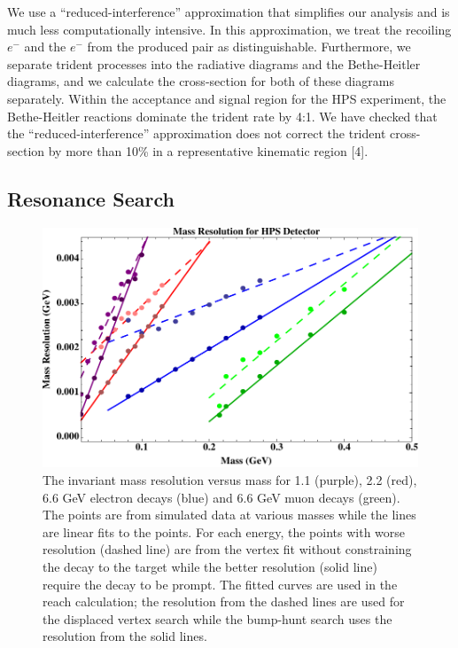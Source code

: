 We use a ``reduced-interference'' approximation that simplifies our analysis and is much 
less computationally intensive.  In this approximation, we treat the recoiling $e^-$ and 
the $e^-$ from the produced pair as distinguishable. Furthermore, we separate trident 
processes into the radiative diagrams and the Bethe-Heitler diagrams, and
 we calculate the cross-section for both of these diagrams separately.
 Within the acceptance and signal region for the HPS experiment, the Bethe-Heitler 
reactions dominate the trident rate by 4:1. We have checked that the ``reduced-interference''
 approximation does not correct the trident cross-section by more than 10\% in a 
representative kinematic region [4].



\subsection{Resonance Search}


\begin{figure}
\includegraphics[scale=1.0]{reach/mass-resolution.pdf}
\caption{The invariant mass resolution versus mass for 1.1 (purple), 2.2 (red), 6.6 GeV  electron decays  (blue) and 6.6 GeV muon decays (green).  
The points are from simulated data at various masses while the lines are linear fits to the points.  For each energy, the points with worse resolution (dashed line) are from the vertex fit without constraining the decay to the target while the better resolution (solid line) require the decay to be prompt.
The fitted curves are used in the reach calculation; the resolution from the dashed lines are used for the displaced vertex search while the bump-hunt search uses the resolution from the solid lines.}
\label{fig:massresReach}
\end{figure} 

